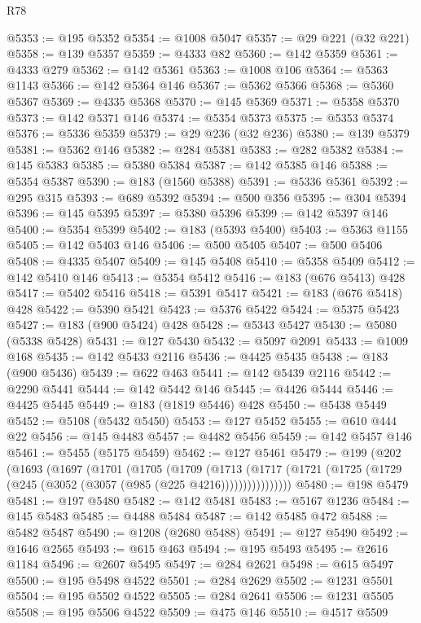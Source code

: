 \begin{lexlean}{R78}
\begin{coremodule}
@5353 := @195 @5352
@5354 := @1008 @5047
@5357 := @29 @221 (@32 @221)
@5358 := @139 @5357
@5359 := @4333 @82
@5360 := @142 @5359
@5361 := @4333 @279
@5362 := @142 @5361
@5363 := @1008 @106
@5364 := @5363 @1143
@5366 := @142 @5364 @146
@5367 := @5362 @5366
@5368 := @5360 @5367
@5369 := @4335 @5368
@5370 := @145 @5369
@5371 := @5358 @5370
@5373 := @142 @5371 @146
@5374 := @5354 @5373
@5375 := @5353 @5374
@5376 := @5336 @5359
@5379 := @29 @236 (@32 @236)
@5380 := @139 @5379
@5381 := @5362 @146
@5382 := @284 @5381
@5383 := @282 @5382
@5384 := @145 @5383
@5385 := @5380 @5384
@5387 := @142 @5385 @146
@5388 := @5354 @5387
@5390 := @183 (@1560 @5388)
@5391 := @5336 @5361
@5392 := @295 @315
@5393 := @689 @5392
@5394 := @500 @356
@5395 := @304 @5394
@5396 := @145 @5395
@5397 := @5380 @5396
@5399 := @142 @5397 @146
@5400 := @5354 @5399
@5402 := @183 (@5393 @5400)
@5403 := @5363 @1155
@5405 := @142 @5403 @146
@5406 := @500 @5405
@5407 := @500 @5406
@5408 := @4335 @5407
@5409 := @145 @5408
@5410 := @5358 @5409
@5412 := @142 @5410 @146
@5413 := @5354 @5412
@5416 := @183 (@676 @5413) @428
@5417 := @5402 @5416
@5418 := @5391 @5417
@5421 := @183 (@676 @5418) @428
@5422 := @5390 @5421
@5423 := @5376 @5422
@5424 := @5375 @5423
@5427 := @183 (@900 @5424) @428
@5428 := @5343 @5427
@5430 := @5080 (@5338 @5428)
@5431 := @127 @5430
@5432 := @5097 @2091
@5433 := @1009 @168
@5435 := @142 @5433 @2116
@5436 := @4425 @5435
@5438 := @183 (@900 @5436)
@5439 := @622 @463
@5441 := @142 @5439 @2116
@5442 := @2290 @5441
@5444 := @142 @5442 @146
@5445 := @4426 @5444
@5446 := @4425 @5445
@5449 := @183 (@1819 @5446) @428
@5450 := @5438 @5449
@5452 := @5108 (@5432 @5450)
@5453 := @127 @5452
@5455 := @610 @444 @22
@5456 := @145 @4483
@5457 := @4482 @5456
@5459 := @142 @5457 @146
@5461 := @5455 (@5175 @5459)
@5462 := @127 @5461
@5479 := @199
    (@202
      (@1693
        (@1697
          (@1701
            (@1705
              (@1709
                (@1713
                  (@1717 (@1721 (@1725 (@1729 (@245 (@3052 (@3057 (@985 (@225 @4216))))))))))))))))
@5480 := @198 @5479
@5481 := @197 @5480
@5482 := @142 @5481
@5483 := @5167 @1236
@5484 := @145 @5483
@5485 := @4488 @5484
@5487 := @142 @5485 @472
@5488 := @5482 @5487
@5490 := @1208 (@2680 @5488)
@5491 := @127 @5490
@5492 := @1646 @2565
@5493 := @615 @463
@5494 := @195 @5493
@5495 := @2616 @1184
@5496 := @2607 @5495
@5497 := @284 @2621
@5498 := @615 @5497
@5500 := @195 @5498 @4522
@5501 := @284 @2629
@5502 := @1231 @5501
@5504 := @195 @5502 @4522
@5505 := @284 @2641
@5506 := @1231 @5505
@5508 := @195 @5506 @4522
@5509 := @475 @146
@5510 := @4517 @5509

\end{coremodule}
\end{lexlean}
